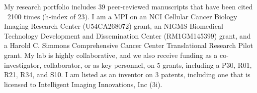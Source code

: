 My research portfolio includes 39 peer-reviewed manuscripts that have been cited ~2100 times (h-index of 23). I am a MPI on an NCI Cellular Cancer Biology Imaging Research Center (U54CA268072) grant, an NIGMS Biomedical Technology Development and Dissemination Center (RM1GM145399) grant, and a Harold C. Simmons Comprehensive Cancer Center Translational Research Pilot grant. My lab is highly collaborative, and we also receive funding as a co-investigator, collaborator, or as key personnel, on 5 grants, including a P30, R01, R21, R34, and S10. I am listed as an inventor on 3 patents, including one that is licensed to Intelligent Imaging Innovations, Inc (3i).